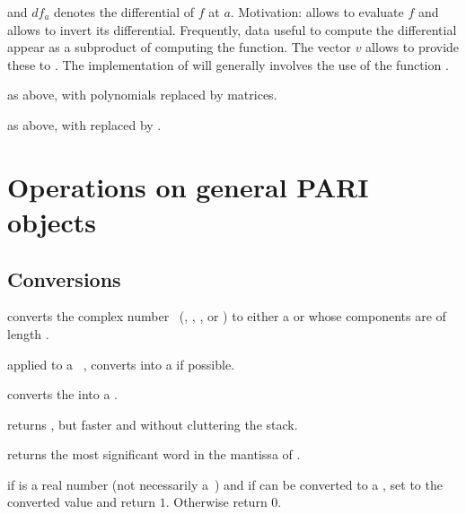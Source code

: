 \noindent and $df_a$ denotes the differential of $f$ at $a$. Motivation:
 allows to evaluate $f$ and  allows to invert its
differential. Frequently, data useful to compute the differential appear as a
subproduct of computing the function. The vector $v$ allows  to
provide these to . The implementation of  will generally
involves the use of the function .

as above, with polynomials replaced by matrices.

as above, with  replaced by .


\newpage
\chapter{Operations on general PARI objects}

\section{Conversions}


 converts the complex number~
(, , ,  or ) to either
a  or  whose components are  of length
.

 applied to a ~, converts 
into a  if possible.

 converts the   into a
.

 returns , but
faster and without cluttering the stack.

 returns the most significant word
in the mantissa of .

 if  is a real number (not
necessarily a~) and if  can be converted to a
, set  to the converted value and return $1$.
Otherwise return $0$.

